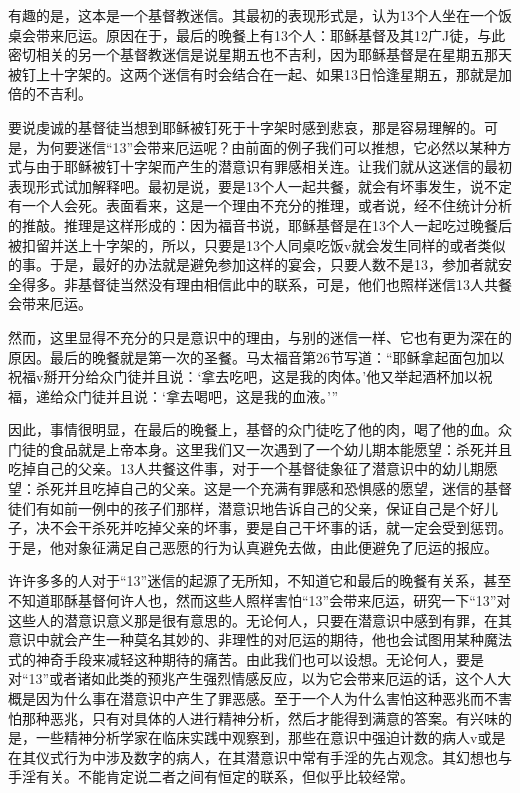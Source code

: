 \documentclass[UTF8,10pt,a4paper,openany]{book}
\begin{document}
有趣的是，这本是一个基督教迷信。其最初的表现形式是，认为13个人坐在一个饭桌会带来厄运。原因在于，最后的晚餐上有13个人：耶稣基督及其12广J徒，与此密切相关的另一个基督教迷信是说星期五也不吉利，因为耶稣基督是在星期五那天被钉上十字架的。这两个迷信有时会结合在一起、如果13日恰逢星期五，那就是加倍的不吉利。

要说虔诚的基督徒当想到耶稣被钉死于十字架时感到悲哀，那是容易理解的。可是，为何要迷信“13”会带来厄运呢？由前面的例子我们可以推想，它必然以某种方式与由于耶稣被钉十字架而产生的潜意识有罪感相关连。让我们就从这迷信的最初表现形式试加解释吧。最初是说，要是13个人一起共餐，就会有坏事发生，说不定有一个人会死。表面看来，这是一个理由不充分的推理，或者说，经不住统计分析的推敲。推理是这样形成的：因为福音书说，耶稣基督是在13个人一起吃过晚餐后被扣留并送上十字架的，所以，只要是13个人同桌吃饭v就会发生同样的或者类似的事。于是，最好的办法就是避免参加这样的宴会，只要人数不是13，参加者就安全得多。非基督徒当然没有理由相信此中的联系，可是，他们也照样迷信13人共餐会带来厄运。

然而，这里显得不充分的只是意识中的理由，与别的迷信一样、它也有更为深在的原因。最后的晚餐就是第一次的圣餐。马太福音第26节写道：“耶稣拿起面包加以祝福v掰开分给众门徒并且说：‘拿去吃吧，这是我的肉体。’他又举起酒杯加以祝福，递给众门徒并且说：‘拿去喝吧，这是我的血液。’”

因此，事情很明显，在最后的晚餐上，基督的众门徒吃了他的肉，喝了他的血。众门徒的食品就是上帝本身。这里我们又一次遇到了一个幼儿期本能愿望：杀死并且吃掉自己的父亲。13人共餐这件事，对于一个基督徒象征了潜意识中的幼儿期愿望：杀死并且吃掉自己的父亲。这是一个充满有罪感和恐惧感的愿望，迷信的基督徒们有如前一例中的孩子们那样，潜意识地告诉自己的父亲，保证自己是个好儿子，决不会干杀死并吃掉父亲的坏事，要是自己干坏事的话，就一定会受到惩罚。于是，他对象征满足自己恶愿的行为认真避免去做，由此便避免了厄运的报应。

许许多多的人对于“13”迷信的起源了无所知，不知道它和最后的晚餐有关系，甚至不知道耶酥基督何许人也，然而这些人照样害怕“13”会带来厄运，研究一下“13”对这些人的潜意识意义那是很有意思的。无论何人，只要在潜意识中感到有罪，在其意识中就会产生一种莫名其妙的、非理性的对厄运的期待，他也会试图用某种魔法式的神奇手段来减轻这种期待的痛苦。由此我们也可以设想。无论何人，要是对“13”或者诸如此类的预兆产生强烈情感反应，以为它会带来厄运的话，这个人大概是因为什么事在潜意识中产生了罪恶感。至于一个人为什么害怕这种恶兆而不害怕那种恶兆，只有对具体的人进行精神分析，然后才能得到满意的答案。有兴味的是，一些精神分析学家在临床实践中观察到，那些在意识中强迫计数的病人v或是在其仪式行为中涉及数字的病人，在其潜意识中常有手淫的先占观念。其幻想也与手淫有关。不能肯定说二者之间有恒定的联系，但似乎比较经常。
\end{document}
